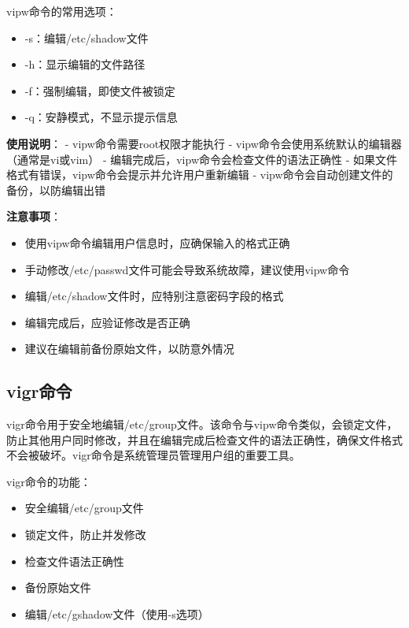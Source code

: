 \documentclass[12pt,UTF8]{ctexbook}
\begin{document}
vipw命令的常用选项：
\begin{itemize}
    \item -s：编辑/etc/shadow文件
    \item -h：显示编辑的文件路径
    \item -f：强制编辑，即使文件被锁定
    \item -q：安静模式，不显示提示信息
\end{itemize}

\textbf{使用说明}：
- vipw命令需要root权限才能执行
- vipw命令会使用系统默认的编辑器（通常是vi或vim）
- 编辑完成后，vipw命令会检查文件的语法正确性
- 如果文件格式有错误，vipw命令会提示并允许用户重新编辑
- vipw命令会自动创建文件的备份，以防编辑出错

\textbf{注意事项}：
\begin{itemize}
    \item 使用vipw命令编辑用户信息时，应确保输入的格式正确
    \item 手动修改/etc/passwd文件可能会导致系统故障，建议使用vipw命令
    \item 编辑/etc/shadow文件时，应特别注意密码字段的格式
    \item 编辑完成后，应验证修改是否正确
    \item 建议在编辑前备份原始文件，以防意外情况
\end{itemize}

\subsection{vigr命令}
vigr命令用于安全地编辑/etc/group文件。该命令与vipw命令类似，会锁定文件，防止其他用户同时修改，并且在编辑完成后检查文件的语法正确性，确保文件格式不会被破坏。vigr命令是系统管理员管理用户组的重要工具。

vigr命令的功能：
\begin{itemize}
    \item 安全编辑/etc/group文件
    \item 锁定文件，防止并发修改
    \item 检查文件语法正确性
    \item 备份原始文件
    \item 编辑/etc/gshadow文件（使用-s选项）
\end{itemize}
\end{document}
